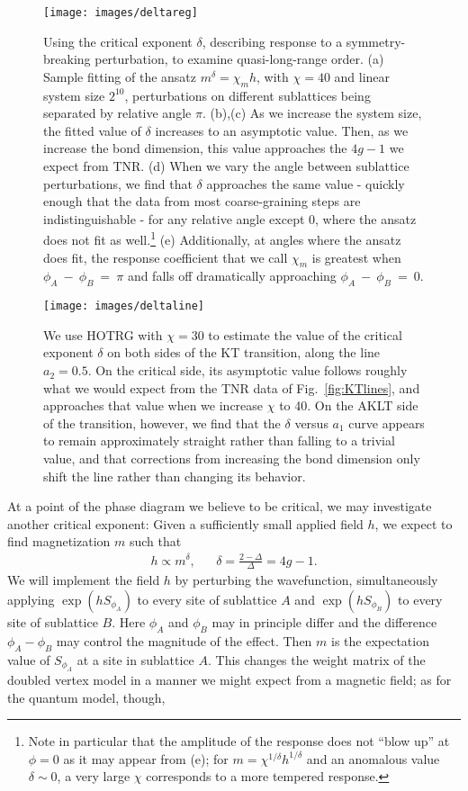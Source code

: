 \documentclass[aps,prb,letterpaper,superscriptaddress,twocolumn,showpacs,floatfix,10pt]{revtex4-1}
\begin{document}
\begin{figure}
\texttt{[image: images/deltareg]}
\caption{Using the critical  exponent $\delta$, describing response to a
symmetry-breaking perturbation, to examine quasi-long-range order.
(a) Sample fitting of the ansatz $m^\delta = \chi_mh$, with $\chi=40$ and
linear system size $2^{10}$, perturbations on different sublattices being
separated by relative angle $\pi$. (b),(c) As we increase the system size, the
fitted value of $\delta$ increases to an asymptotic value. Then, as we increase
the bond dimension, this value approaches the $4g-1$ we expect from TNR.
(d) When we vary the angle between sublattice perturbations, we find that
$\delta$ approaches the same value - quickly enough that the data from most
coarse-graining steps are indistinguishable -
for any relative angle except 0, where
the ansatz does not fit as well.\footnote{Note in particular that the amplitude
of the response does not ``blow up'' at $\phi=0$ as it may appear from
(e); for $m = \chi^{1/\delta}h^{1/\delta}$ and an anomalous value $\delta\sim0$,
a very large $\chi$ corresponds to a more tempered response.}
(e) Additionally, at angles where the ansatz
does fit, the response coefficient that we call $\chi_m$ is greatest 
when $\phi_A~-~\phi_B~=~\pi$ and falls off dramatically approaching
$\phi_A~-~\phi_B~=~0$.}
\label{fig:deltareg}
\end{figure}

\begin{figure}
\texttt{[image: images/deltaline]}
\caption{We use HOTRG with $\chi=30$ to estimate the value of the critical
exponent $\delta$ on both sides of the KT transition, along the line
$a_2 = 0.5$. On the critical side,
its asymptotic value follows roughly what we would expect from the TNR data of
Fig.~\ref{fig:KTlines}, and approaches that value when we
increase $\chi$ to 40. On the AKLT side of the transition, however, we find
that the $\delta$ versus $a_1$ curve appears to remain approximately straight
rather than falling to a trivial value, and that corrections from increasing
the bond dimension only shift the line rather than changing its behavior.}
\label{fig:deltaline}
\end{figure}

At a point of the phase diagram we believe to be critical,
we may investigate another critical exponent:
Given a sufficiently small applied field $h$, we expect to find
magnetization $m$ such that \cite{Cardy}
\begin{align}
\label{eqn:delta}
h \propto m^\delta, && \delta = \frac{2-\Delta}{\Delta} = 4g-1.
\end{align}
We will implement the field $h$ by perturbing the wavefunction, simultaneously
applying $\exp(hS_{\phi_A})$
to every site of sublattice $A$ and $\exp(hS_{\phi_B})$
to every site of
sublattice $B$. Here $\phi_A$ and $\phi_B$ may in principle differ and the
difference $\phi_A - \phi_B$ may control the magnitude of the effect. Then
$m$ is the expectation value of $S_{\phi_A}$ at a site in sublattice $A$.
This changes the weight matrix of the doubled vertex model in a manner we
might expect from a magnetic field; as for the quantum model, though,
\end{document}

